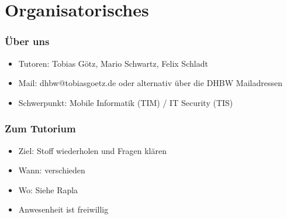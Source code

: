\section{Organisatorisches}
\begin{frame}
    \frametitle{Über uns}
    \begin{itemize}
        \item Tutoren: Tobias Götz, Mario Schwartz, Felix Schladt
        \item Mail: dhbw@tobiasgoetz.de oder alternativ über die DHBW Mailadressen
		\item Schwerpunkt: Mobile Informatik (TIM) / IT Security (TIS)
    \end{itemize}
\end{frame}

\begin{frame}
    \frametitle{Zum Tutorium}
    \begin{itemize}
        \item Ziel: Stoff wiederholen und Fragen klären
        \item Wann: verschieden
        \item Wo: Siehe Rapla
        \item Anwesenheit ist freiwillig
    \end{itemize}
\end{frame}
